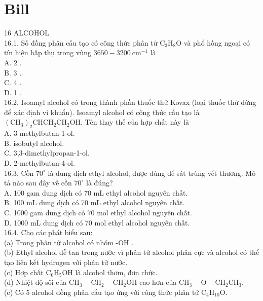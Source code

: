 \documentclass[10pt]{article}
\begin{document}
\section*{Bill}
16 ALCOHOL\\
16.1. Số đồng phân cấu tạo có công thức phân tử $\mathrm{C}_{3} \mathrm{H}_{8} \mathrm{O}$ và phổ hồng ngoại có tín hiệu hấp thụ trong vùng $3650-3200 \mathrm{~cm}^{-1}$ là\\
A. 2 .\\
B. 3 .\\
C. 4 .\\
D. 1 .\\
16.2. Isoamyl alcohol có trong thành phần thuốc thử Kovax (loại thuốc thử dừng để xác định vi khuẩn). Isoamyl alcohol có công thức cấu tạo là $\left(\mathrm{CH}_{3}\right)_{2} \mathrm{CHCH}_{2} \mathrm{CH}_{2} \mathrm{OH}$. Tên thay thế của hợp chất này là\\
A. 3-methylbutan-1-ol.\\
B. isobutyl alcohol.\\
C. 3,3-dimethylpropan-1-ol.\\
D. 2-methylbutan-4-ol.\\
16.3. Cồn $70^{\circ}$ là dung dịch ethyl alcohol, được dùng để sát trùng vết thương. Mô tả nào sau đây về cồn $70^{\circ}$ là đúng?\\
A. 100 gam dung dịch có 70 mL ethyl alcohol nguyên chất.\\
B. 100 mL dung dịch có 70 mL ethyl alcohol nguyên chất.\\
C. 1000 gam dung dịch có 70 mol ethyl alcohol nguyên chất.\\
D. 1000 mL dung dịch có 70 mol ethyl alcohol nguyên chất.\\
16.4. Cho các phát biểu sau:\\
(a) Trong phân tử alcohol có nhóm -OH .\\
(b) Ethyl alcohol dễ tan trong nước vì phân tử alcohol phân cực và alcohol có thể tạo liên kết hydrogen với phân tử nước.\\
(c) Hợp chất $\mathrm{C}_{6} \mathrm{H}_{5} \mathrm{OH}$ là alcohol thơm, đơn chức.\\
(d) Nhiệt độ sôi của $\mathrm{CH}_{3}-\mathrm{CH}_{2}-\mathrm{CH}_{2} \mathrm{OH}$ cao hơn của $\mathrm{CH}_{3}-\mathrm{O}-\mathrm{CH}_{2} \mathrm{CH}_{3}$.\\
(e) Có 5 alcohol đồng phân cấu tạo ứng với công thức phân tử $\mathrm{C}_{4} \mathrm{H}_{10} \mathrm{O}$.
\end{document}
